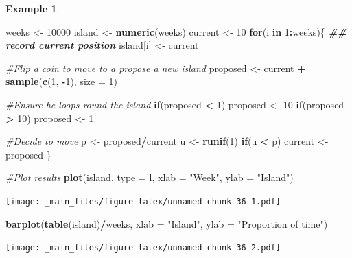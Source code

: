 \documentclass[
]{book}
\newenvironment{Shaded}{\begin{snugshade}}{\end{snugshade}}
\newcommand{\AttributeTok}[1]{\textcolor[rgb]{0.13,0.29,0.53}{#1}}
\newcommand{\CommentTok}[1]{\textcolor[rgb]{0.56,0.35,0.01}{\textit{#1}}}
\newcommand{\ControlFlowTok}[1]{\textcolor[rgb]{0.13,0.29,0.53}{\textbf{#1}}}
\newcommand{\DecValTok}[1]{\textcolor[rgb]{0.00,0.00,0.81}{#1}}
\newcommand{\DocumentationTok}[1]{\textcolor[rgb]{0.56,0.35,0.01}{\textbf{\textit{#1}}}}
\newcommand{\FunctionTok}[1]{\textcolor[rgb]{0.13,0.29,0.53}{\textbf{#1}}}
\newcommand{\NormalTok}[1]{#1}
\newcommand{\OtherTok}[1]{\textcolor[rgb]{0.56,0.35,0.01}{#1}}
\newcommand{\SpecialCharTok}[1]{\textcolor[rgb]{0.81,0.36,0.00}{\textbf{#1}}}
\newcommand{\StringTok}[1]{\textcolor[rgb]{0.31,0.60,0.02}{#1}}
\theoremstyle{definition}
\theoremstyle{definition}
\newtheorem{example}{Example}[chapter]
\theoremstyle{definition}
\theoremstyle{definition}
\theoremstyle{remark}
\begin{document}
\begin{example}
\begin{Shaded}
\begin{Highlighting}[]
\NormalTok{weeks }\OtherTok{\textless{}{-}} \DecValTok{10000}
\NormalTok{island }\OtherTok{\textless{}{-}} \FunctionTok{numeric}\NormalTok{(weeks)}
\NormalTok{current }\OtherTok{\textless{}{-}} \DecValTok{10}
\ControlFlowTok{for}\NormalTok{(i }\ControlFlowTok{in} \DecValTok{1}\SpecialCharTok{:}\NormalTok{weeks)\{}
  \DocumentationTok{\#\# record current position}
\NormalTok{  island[i] }\OtherTok{\textless{}{-}}\NormalTok{ current}
  
  \CommentTok{\#Flip a coin to move to a propose a new island}
\NormalTok{  proposed }\OtherTok{\textless{}{-}}\NormalTok{ current }\SpecialCharTok{+} \FunctionTok{sample}\NormalTok{(}\FunctionTok{c}\NormalTok{(}\DecValTok{1}\NormalTok{, }\SpecialCharTok{{-}}\DecValTok{1}\NormalTok{), }\AttributeTok{size =} \DecValTok{1}\NormalTok{)}
  
  \CommentTok{\#Ensure he loops round the island}
  \ControlFlowTok{if}\NormalTok{(proposed }\SpecialCharTok{\textless{}} \DecValTok{1}\NormalTok{) }
\NormalTok{    proposed }\OtherTok{\textless{}{-}} \DecValTok{10}
  \ControlFlowTok{if}\NormalTok{(proposed }\SpecialCharTok{\textgreater{}} \DecValTok{10}\NormalTok{)}
\NormalTok{    proposed }\OtherTok{\textless{}{-}} \DecValTok{1}
  
  \CommentTok{\#Decide to move}
\NormalTok{  p }\OtherTok{\textless{}{-}}\NormalTok{ proposed}\SpecialCharTok{/}\NormalTok{current}
\NormalTok{  u }\OtherTok{\textless{}{-}} \FunctionTok{runif}\NormalTok{(}\DecValTok{1}\NormalTok{)}
  \ControlFlowTok{if}\NormalTok{(u }\SpecialCharTok{\textless{}}\NormalTok{ p)}
\NormalTok{    current }\OtherTok{\textless{}{-}}\NormalTok{ proposed}
\NormalTok{\}}

\CommentTok{\#Plot results}
\FunctionTok{plot}\NormalTok{(island, }\AttributeTok{type =} \StringTok{\textquotesingle{}l\textquotesingle{}}\NormalTok{, }\AttributeTok{xlab =} \StringTok{"Week"}\NormalTok{, }\AttributeTok{ylab =} \StringTok{"Island"}\NormalTok{)}
\end{Highlighting}
\end{Shaded}

\texttt{[image: \_main\_files/figure-latex/unnamed-chunk-36-1.pdf]}

\begin{Shaded}
\begin{Highlighting}[]
\FunctionTok{barplot}\NormalTok{(}\FunctionTok{table}\NormalTok{(island)}\SpecialCharTok{/}\NormalTok{weeks, }\AttributeTok{xlab =} \StringTok{"Island"}\NormalTok{, }
        \AttributeTok{ylab =} \StringTok{"Proportion of time"}\NormalTok{)}
\end{Highlighting}
\end{Shaded}

\texttt{[image: \_main\_files/figure-latex/unnamed-chunk-36-2.pdf]}
\end{example}
\end{document}
